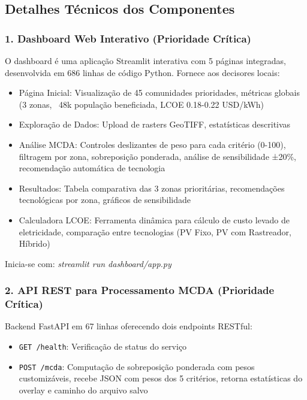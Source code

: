 \documentclass[12pt, a4paper]{article}
\begin{document}
\subsection{Detalhes Técnicos dos Componentes}

\subsubsection{1. Dashboard Web Interativo (Prioridade Crítica)}

O dashboard é uma aplicação Streamlit interativa com 5 páginas integradas, desenvolvida em 686 linhas de código Python. Fornece aos decisores locais:

\begin{itemize}
    \item Página Inicial: Visualização de 45 comunidades prioridades, métricas globais (3 zonas, ~48k população beneficiada, LCOE 0.18-0.22 USD/kWh)
    \item Exploração de Dados: Upload de rasters GeoTIFF, estatísticas descritivas
    \item Análise MCDA: Controles deslizantes de peso para cada critério (0-100), filtragem por zona, sobreposição ponderada, análise de sensibilidade ±20\%, recomendação automática de tecnologia
    \item Resultados: Tabela comparativa das 3 zonas prioritárias, recomendações tecnológicas por zona, gráficos de sensibilidade
    \item Calculadora LCOE: Ferramenta dinâmica para cálculo de custo levado de eletricidade, comparação entre tecnologias (PV Fixo, PV com Rastreador, Híbrido)
\end{itemize}

Inicia-se com: \textit{streamlit run dashboard/app.py}

\subsubsection{2. API REST para Processamento MCDA (Prioridade Crítica)}

Backend FastAPI em 67 linhas oferecendo dois endpoints RESTful:

\begin{itemize}
    \item \texttt{GET /health}: Verificação de status do serviço
    \item \texttt{POST /mcda}: Computação de sobreposição ponderada com pesos customizáveis, recebe JSON com pesos dos 5 critérios, retorna estatísticas do overlay e caminho do arquivo salvo
\end{itemize}
\end{document}
